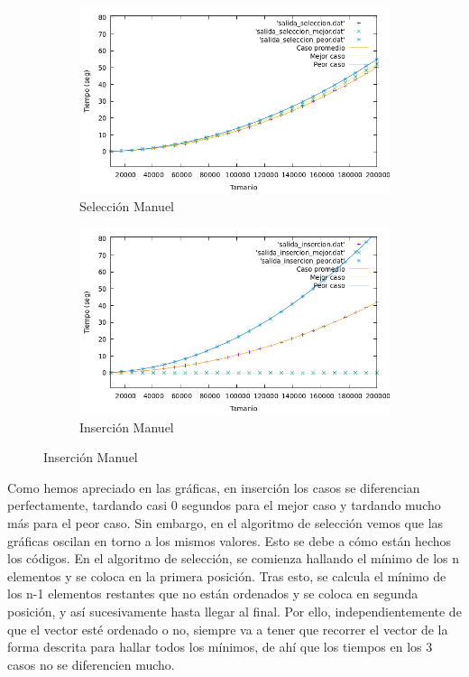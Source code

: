 \documentclass[10pt,a4paper]{article}
\begin{document}
\begin{figure}[h!]
	\begin{subfigure}{.5\textwidth}
		\centering
		\includegraphics[scale=0.3]{../../Images/Casos_seleccion_ManuelMoya.png}
		\caption{Selección Manuel}
	\end{subfigure}
	\hfill
	\begin{subfigure}{.5\textwidth}
		\centering
		\includegraphics[scale=0.3]{../../Images/Casos_insercion_ManuelMoya.png}
		\caption{Inserción Manuel}
	\end{subfigure}
\end{figure}


\newpage{\ }


Como hemos apreciado en las gráficas, en inserción los casos se diferencian perfectamente, tardando casi 0 segundos para el mejor caso y tardando mucho más para el peor caso. Sin embargo, en el algoritmo de selección vemos que las gráficas oscilan en torno a los mismos valores. Esto se debe a cómo están hechos los códigos. En el algoritmo de selección, se comienza hallando el mínimo de los n elementos y se coloca en la primera posición. Tras esto, se calcula el mínimo de los n-1 elementos restantes que no están ordenados y se coloca en segunda posición, y así sucesivamente hasta llegar al final. Por ello, independientemente de que el vector esté ordenado o no, siempre va a tener que recorrer el vector de la forma descrita para hallar todos los mínimos, de ahí que los tiempos en los 3 casos no se diferencien mucho.\\
\end{document}
